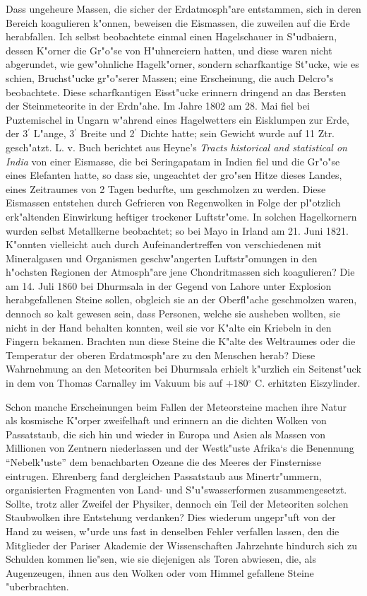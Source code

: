 \documentclass[a4paper, 11pt, oneside]{article}
\begin{document}
Dass ungeheure Massen, die sicher der Erdatmosph"are entstammen, sich in deren Bereich koagulieren k"onnen, beweisen die Eismassen, die zuweilen auf die Erde herabfallen. Ich selbst beobachtete einmal einen Hagelschauer in S"udbaiern, dessen K"orner die Gr"o"se von H"uhnereiern hatten, und diese waren nicht abgerundet, wie gew"ohnliche Hagelk"orner, sondern scharfkantige St"ucke, wie es schien, Bruchst"ucke gr"o"serer Massen; eine Erscheinung, die auch Delcro"s beobachtete. Diese scharfkantigen Eisst"ucke erinnern dringend an das Bersten der Steinmeteorite in der Erdn"ahe. Im Jahre 1802 am 28. Mai fiel bei Puztemischel in Ungarn w"ahrend eines Hagelwetters ein Eisklumpen zur Erde, der 3$^{\prime}$ L"ange, 3$^{\prime}$ Breite und 2$^{\prime}$ Dichte hatte; sein Gewicht wurde auf 11 Ztr. gesch"atzt. L. v. Buch berichtet aus Heyne's \emph{Tracts historical and statistical on India} von einer Eismasse, die bei Seringapatam in Indien fiel und die Gr"o"se eines Elefanten hatte, so dass sie, ungeachtet der gro"sen Hitze dieses Landes, eines Zeitraumes von 2 Tagen bedurfte, um geschmolzen zu werden. Diese Eismassen entstehen durch Gefrieren von Regenwolken in Folge der pl"otzlich erk"altenden Einwirkung heftiger trockener Luftstr"ome. In solchen Hagelkornern wurden selbst Metallkerne beobachtet; so bei Mayo in Irland am 21. Juni 1821. K"onnten vielleicht auch durch Aufeinandertreffen von verschiedenen mit Mineralgasen und Organismen geschw"angerten Luftstr"omungen in den h"ochsten Regionen der Atmosph"are jene Chondritmassen sich koagulieren? Die am 14. Juli 1860 bei Dhurmsala in der Gegend von Lahore unter Explosion herabgefallenen Steine sollen, obgleich sie an der Oberfl"ache geschmolzen waren, dennoch so kalt gewesen sein, dass Personen, welche sie ausheben wollten, sie nicht in der Hand behalten konnten, weil sie vor K"alte ein Kriebeln in den Fingern bekamen. Brachten nun diese Steine die K"alte des Weltraumes oder die Temperatur der oberen Erdatmosph"are zu den Menschen herab? Diese Wahrnehmung an den Meteoriten bei Dhurmsala erhielt k"urzlich ein Seitenst"uck in dem von Thomas Carnalley im Vakuum bis auf +180$^{\circ}$ C. erhitzten Eiszylinder.

Schon manche Erscheinungen beim Fallen der Meteorsteine machen ihre Natur als kosmische K"orper zweifelhaft und erinnern an die dichten Wolken von Passatstaub, die sich hin und wieder in Europa und Asien als Massen von Millionen von Zentnern niederlassen und der Westk"uste Afrika‘s die Benennung "`Nebelk"uste"' dem benachbarten Ozeane die des Meeres der Finsternisse eintrugen. Ehrenberg fand dergleichen Passatstaub aus Minertr"ummern, organisierten Fragmenten von Land- und S"u"swasserformen zusammengesetzt. Sollte, trotz aller Zweifel der Physiker, dennoch ein Teil der Meteoriten solchen Staubwolken ihre Entstehung verdanken? Dies wiederum ungepr"uft von der Hand zu weisen, w"urde uns fast in denselben Fehler verfallen lassen, den die Mitglieder der Pariser Akademie der Wissenschaften Jahrzehnte hindurch sich zu Schulden kommen lie"sen, wie sie diejenigen als Toren abwiesen, die, als Augenzeugen, ihnen aus den Wolken oder vom Himmel gefallene Steine "uberbrachten.
\end{document}

